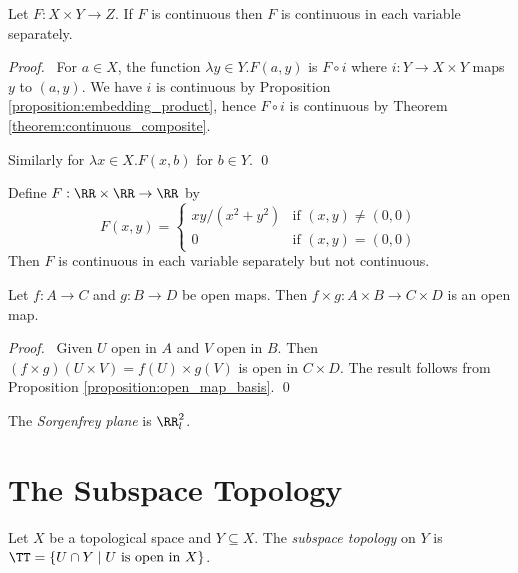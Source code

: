 \begin{proposition}
    Let $F : X \times Y \rightarrow Z$. If $F$ is continuous then $F$ is continuous in each
    variable separately.
\end{proposition}

\begin{proof}
    \pf\ For $a \in X$, the function $\lambda y \in Y. F(a,y)$ is $F \circ i$ where $i : Y \rightarrow X \times Y$ maps $y$ to $(a,y)$.
    We have $i$ is continuous by Proposition \ref{proposition:embedding_product}, hence $F \circ i$ is continuous by Theorem \ref{theorem:continuous_composite}.

    Similarly for $\lambda x \in X. F(x,b)$ for $b \in Y$. \qed
\end{proof}

\begin{example}
    Define $F : \RR \times \RR \rightarrow \RR$ by
    \[ F(x,y) = \begin{cases}
        xy / (x^2 + y^2) & \text{if } (x,y) \neq (0,0) \\
        0 & \text{if } (x,y) = (0,0)
    \end{cases} \]
    Then $F$ is continuous in each variable separately but not continuous.
\end{example}

\begin{proposition}
    \label{proposition:open_map_product}
    Let $f : A \rightarrow C$ and $g : B \rightarrow D$ be open maps. Then $f \times g : A \times B \rightarrow C \times D$ is an open map.
\end{proposition}

\begin{proof}
    \pf\ Given $U$ open in $A$ and $V$ open in $B$. Then $(f \times g)(U \times V) = f(U) \times g(V)$ is open in $C \times D$.
    The result follows from Proposition \ref{proposition:open_map_basis}. \qed
\end{proof}

\begin{definition}
    The \emph{Sorgenfrey plane} is $\RR_l^2$.    
\end{definition}

\section{The Subspace Topology}

\begin{definition}
    Let $X$ be a topological space and $Y \subseteq X$. The \emph{subspace topology} on $Y$ is
    $\TT = \{ U \cap Y \mid U \text{ is open in } X \}$.
\end{definition}

